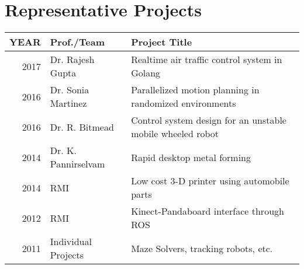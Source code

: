 \documentclass[]{deedy-resume-openfont}
\begin{document}
\begin{minipage}[t]{0.66\textwidth}


\newcommand\Topstrut{\rule{0pt}{2.1ex}}
\newcommand\Bottomstrut{\rule[-0.6ex]{0pt}{0pt}}

\section{Representative Projects}
\begin{tabular}{rll}

YEAR	     & Prof./Team  & Project Title \\
\hline
2017\rule{0pt}{3ex}	     & Dr. Rajesh Gupta & Realtime air traffic control system in Golang\\ 
2016         & Dr. Sonia Martinez & Parallelized motion planning in randomized environments\\
2016         &Dr. R. Bitmead & Control system design for an unstable mobile wheeled robot\\
2014	     & Dr. K. Pannirselvam  & Rapid desktop metal forming\\
2014	     & RMI  & Low cost 3-D printer using automobile parts\\
2012	     & RMI & Kinect-Pandaboard interface through ROS\\
2011        &  Individual Projects & Maze Solvers, tracking robots, etc.\\
\end{tabular}
\sectionsep








\end{minipage} 
\end{document}
